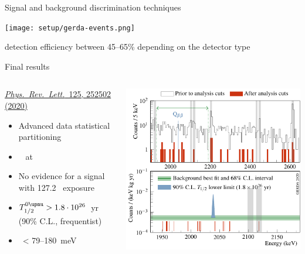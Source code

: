 \documentclass[10pt,aspectratio=169]{beamer}
\begin{document}
\begin{frame}{Signal and background discrimination techniques}
  \begin{center}
    \texttt{[image: setup/gerda-events.png]}
  \end{center}
  \begin{simpleblock}
    \begin{center}
      \alert{\onbb} detection \alert{efficiency} between \alert{45--65\%}
      depending on the detector type
    \end{center}
  \end{simpleblock}
\end{frame}
\begin{frame}{Final results}
  \begin{columns}
    \begin{column}{0.45\textwidth}
      \begin{simpleblock}
        \href{https://doi.org/10.1103/PhysRevLett.125.252502}{\emph{Phys.~Rev.~Lett.}~125, 252502 (2020)}
      \end{simpleblock}
      \begin{itemize}
        \item Advanced data statistical partitioning
        \item \alert{~} at \qbb
        \item No evidence for a signal with \alert{127.2~\kgyr} exposure
        \item \alert{$\thalfzeroM > \thalfzerolimit$~yr} (90\% C.L., frequentist)
        \item \mbb\ < 79--180~meV
      \end{itemize}
    \end{column}
    \begin{column}{0.55\textwidth}
      \begin{center}
        \includegraphics[width=\columnwidth]{plots/G2006_spectr_prl_2.pdf}
      \end{center}
    \end{column}
  \end{columns}
\end{frame}
\end{document}
